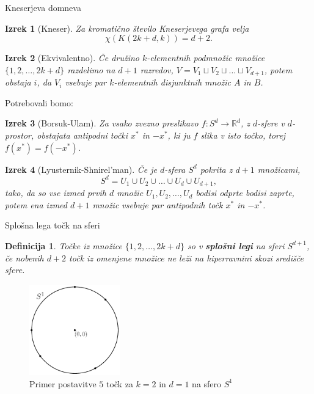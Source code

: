 \documentclass{beamer}
\newtheorem{izrek}{Izrek}
\newtheorem{definicija}{Definicija}
\begin{document}

\begin{frame}{Kneserjeva domneva}

\begin{izrek}[Kneser]
Za kromatično število Kneserjevega grafa velja
$$\chi(K(2k+d,k)) = d+2.$$
\end{izrek}

\pause

\begin{izrek}[Ekvivalentno]
Če družino $k$-elementnih podmnožic množice $\{1, 2, \ldots, 2k+d\}$ razdelimo na $d+1$ razredov,  $V = V_1 \sqcup V_2 \sqcup \ldots \sqcup V_{d+1}$, potem obstaja $i$, da $V_i$ vsebuje par $k$-elementnih disjunktnih množic $A$ in $B$.
\end{izrek}

\end{frame}


\begin{frame}{Potrebovali bomo:}

\begin{izrek}[Borsuk-Ulam]
Za vsako zvezno preslikavo $f:S^d \rightarrow \mathbb{R}^d$, z $d$-sfere v $d$-prostor, obstajata antipodni točki $x^*$ in $-x^*$, ki ju $f$ slika v isto točko, torej $f(x^*)=f(-x^*)$.
\end{izrek}

\begin{izrek}[Lyusternik-Shnirel'man]
Če je $d$-sfera $S^d$ pokrita z $d+1$ množicami,
$$S^d = U_1 \cup U_2 \cup \ldots \cup U_d \cup U_{d+1},$$
tako, da so vse izmed prvih $d$ množic $U_1, U_2, \ldots, U_d$ bodisi odprte bodisi zaprte, potem ena izmed $d+1$ množic vsebuje par antipodnih točk $x^*$ in $-x^*$.
\end{izrek}

\end{frame}


\begin{frame}{Splošna lega točk na sferi}

\begin{definicija}
Točke iz množice $\{1,2,\ldots,2k+d\}$ so v \textbf {splošni legi} na sferi $S^{d+1}$, če nobenih $d+2$ točk iz omenjene množice ne leži na hiperravnini skozi središče sfere.
\end{definicija}

\begin{figure}[h!]
\centering
\includegraphics[width=0.35\textwidth]{splosna_lega}
\caption{Primer postavitve $5$ točk za $k=2$ in $d=1$ na sfero $S^1$}
\end{figure}

\end{frame}
\end{document}
